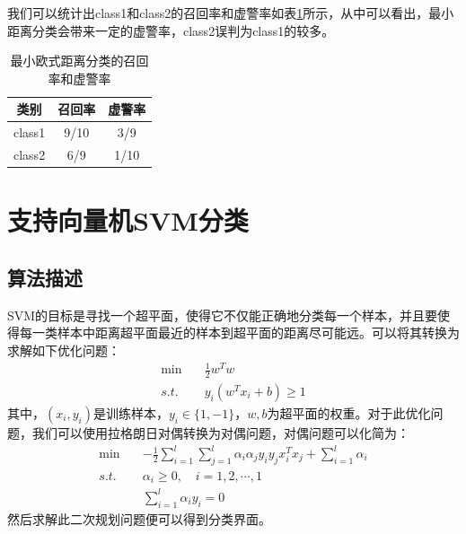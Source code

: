 \documentclass[cn]{elegantbook}
\begin{document}
我们可以统计出class1和class2的召回率和虚警率如表\ref{tab1}所示，从中可以看出，最小距离分类会带来一定的虚警率，class2误判为class1的较多。
\begin{table}[!h]
	\centering\caption{\label{tab1}最小欧式距离分类的召回率和虚警率}
	\begin{tabular}{|c|c|c|}
		\hline
		类别 & 召回率 & 虚警率 \\
		\hline
		class1 & 9/10 & 3/9 \\
		\hline
		class2 & 6/9 & 1/10 \\
		\hline
		\end{tabular}
\end{table}

\section{支持向量机SVM分类}
\subsection{算法描述}
SVM的目标是寻找一个超平面，使得它不仅能正确地分类每一个样本，并且要使得每一类样本中距离超平面最近的样本到超平面的距离尽可能远。可以将其转换为求解如下优化问题：
\begin{equation}
\begin{aligned}
\min \quad&\frac{1}{2}w^Tw\\
s.t.\quad&y_i(w^Tx_i+b)\ge 1
\end{aligned}
\end{equation}
其中，$(x_i,y_i)$是训练样本，$y_i\in\{1,-1\}$，$w,b$为超平面的权重。对于此优化问题，我们可以使用拉格朗日对偶转换为对偶问题，对偶问题可以化简为：
\begin{equation}
\begin{aligned}
\min \quad&-\frac{1}{2}\sum_{i=1}^{l}\sum_{j=1}^l\alpha_i\alpha_jy_iy_jx_i^Tx_j+\sum_{i=1}^l\alpha_i\\
s.t.\quad&\alpha_i\ge 0,\quad i=1,2,\cdots,1\\
&\sum_{i=1}^l\alpha_iy_i=0
\end{aligned}
\end{equation}
然后求解此二次规划问题便可以得到分类界面。
\end{document}

